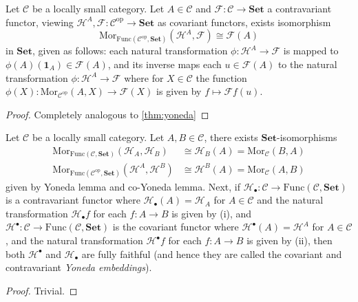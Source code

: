 \documentclass[11pt]{book}
\begin{document}
\begin{corollary}Let $\mathcal C$ be a locally small category. Let $A\in\mathcal C$ and $\mathscr{F}:\mathcal C\rightarrow\mathbf{Set}$ a contravariant functor, viewing $\mathscr{H}^A,\mathscr{F}:\mathcal C^{\mathrm{op}}\rightarrow\mathbf{Set}$ as covariant functors, exists isomorphism
\[\mathrm{Mor}_{\mathrm{Func}(\mathcal C^{\mathrm{op}},\mathbf{Set})}(\mathscr{H}^A,\mathscr{F})\cong \mathscr{F}(A)\]
in $\mathbf{Set}$, given as follows: each natural transformation $\phi:\mathscr H^A\rightarrow\mathscr{F}$ is mapped to $\phi(A)(\mathbf 1_A)\in\mathscr{F}(A)$, and its inverse maps each $u\in\mathscr{F}(A)$ to the natural transformation $\phi:\mathscr H^A\rightarrow\mathscr{F}$ where for $X\in\mathcal C$ the function $\phi(X):\mathrm{Mor}_{\mathcal C^{\mathrm{op}}}(A,X)\rightarrow \mathscr{F}(X)$ is given by $f\mapsto \mathscr{F}f(u)$.
\begin{proof}Completely analogous to \autoref{thm:yoneda}
\end{proof}
\end{corollary}
\begin{corollary}\label{cor:yoneda}Let $\mathcal C$ be a locally small category. Let $A,B\in\mathcal C$, there exists $\mathbf{Set}$-isomorphisms
\begin{align*}
\mathrm{Mor}_{\mathrm{Func}(\mathcal C,\mathbf{Set})}(\mathscr{H}_A,\mathscr{H}_B)&\cong \mathscr{H}_B(A)=\mathrm{Mor}_{\mathcal C}(B,A)\tag{i}\\
\mathrm{Mor}_{\mathrm{Func}(\mathcal C^{\mathrm{op}},\mathbf{Set})}(\mathscr{H}^A,\mathscr{H}^B)&\cong \mathscr{H}^B(A)=\mathrm{Mor}_{\mathcal C}(A,B)\tag{ii}
\end{align*}
given by Yoneda lemma and co-Yoneda lemma. Next, if $\mathscr{H}_\bullet:\mathcal C\rightarrow\mathrm{Func}(\mathcal C,\mathbf{Set})$ is a contravariant functor where $\mathscr{H}_\bullet(A)=\mathscr{H}_A$ for $A\in\mathcal C$ and the natural transformation $\mathscr{H}_\bullet f$ for each $f:A\rightarrow B$ is given by (i), and $\mathscr{H}^\bullet:\mathcal C\rightarrow\mathrm{Func}(\mathcal C,\mathbf{Set})$ is the covariant functor where $\mathscr{H}^\bullet(A)=\mathscr{H}^A$ for $A\in\mathcal C$, and the natural transformation $\mathscr{H}^\bullet f$ for each $f:A\rightarrow B$ is given by (ii), then both $\mathscr{H}^\bullet$ and $\mathscr{H}_\bullet$ are fully faithful (and hence they are called the covariant and contravariant \textit{Yoneda embeddings}).
\begin{proof}Trivial.
\end{proof}
\end{corollary}
\end{document}
